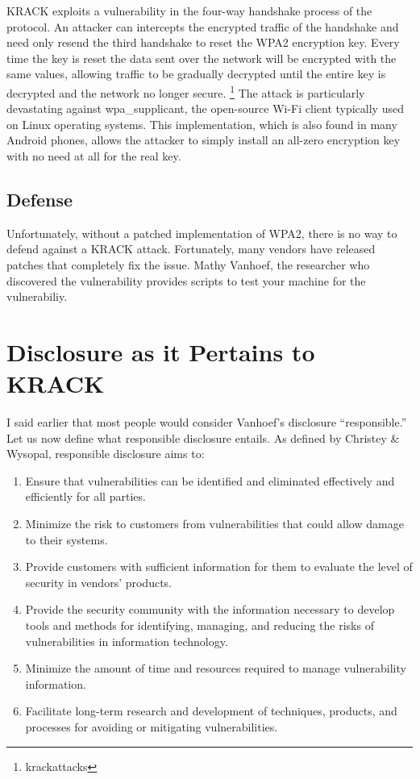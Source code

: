 \documentclass[12pt]{article}
\begin{document}
\begin{doublespace}
KRACK exploits a vulnerability in the four-way handshake process of the
protocol. An attacker can intercepts the encrypted traffic of the handshake and
need only resend the third handshake to reset the WPA2 encryption key. Every
time the key is reset the data sent over the network will be encrypted with
the same values, allowing traffic to be gradually decrypted until the entire
key is decrypted and the network no longer secure. \footnote{krackattacks} The
attack is particularly devastating against wpa\_supplicant, the open-source
Wi-Fi client typically used on Linux operating systems. This implementation,
which is also found in many Android phones, allows the attacker to simply
install an all-zero encryption key with no need at all for the real key.

\subsection*{Defense}
Unfortunately, without a patched implementation of WPA2, there is no way to
defend against a KRACK attack. Fortunately, many vendors have released patches
that completely fix the issue. Mathy Vanhoef, the researcher who discovered the
vulnerability provides scripts to test your machine for the vulnerabiliy.

\section*{Disclosure as it Pertains to KRACK}
I said earlier that most people would consider Vanhoef's disclosure
``responsible.'' Let us now define what responsible disclosure entails. As
defined by Christey \& Wysopal, responsible disclosure aims to:
\end{doublespace}
\begin{enumerate}
  \item Ensure that vulnerabilities can be identified and eliminated
    effectively and efficiently for all parties.
  \item Minimize the risk to customers from vulnerabilities that could
   allow damage to their systems.
  \item Provide customers with sufficient information for them to evaluate
   the level of security in vendors' products.
  \item Provide the security community with the information necessary to
   develop tools and methods for identifying, managing, and reducing the
   risks of vulnerabilities in information technology.
  \item Minimize the amount of time and resources required to manage
   vulnerability information.
  \item Facilitate long-term research and development of techniques,
   products, and processes for avoiding or mitigating vulnerabilities.
\end{enumerate}
\end{document}
